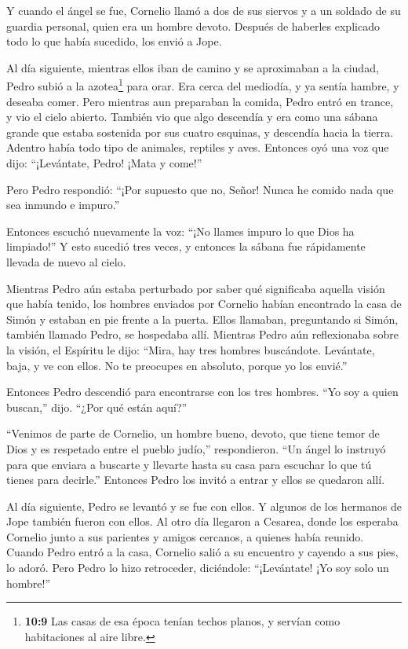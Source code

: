  Y cuando el ángel se fue, Cornelio llamó a dos de sus
siervos y a un soldado de su guardia personal, quien era un hombre
devoto.  Después de haberles explicado todo lo que había
sucedido, los envió a Jope.

 Al día siguiente, mientras ellos iban de camino y se
aproximaban a la ciudad, Pedro subió a la azotea\footnote{\textbf{10:9}
  Las casas de esa época tenían techos planos, y servían como
  habitaciones al aire libre.} para orar. Era cerca del mediodía,
 y ya sentía hambre, y deseaba comer. Pero mientras aun
preparaban la comida, Pedro entró en trance,  y vio el
cielo abierto. También vio que algo descendía y era como una sábana
grande que estaba sostenida por sus cuatro esquinas, y descendía hacia
la tierra.  Adentro había todo tipo de animales, reptiles y
aves.  Entonces oyó una voz que dijo: ``¡Levántate, Pedro!
¡Mata y come!''

 Pero Pedro respondió: ``¡Por supuesto que no, Señor! Nunca
he comido nada que sea inmundo e impuro.''

 Entonces escuchó nuevamente la voz: ``¡No llames impuro lo
que Dios ha limpiado!''  Y esto sucedió tres veces, y
entonces la sábana fue rápidamente llevada de nuevo al cielo.

 Mientras Pedro aún estaba perturbado por saber qué
significaba aquella visión que había tenido, los hombres enviados por
Cornelio habían encontrado la casa de Simón y estaban en pie frente a la
puerta.  Ellos llamaban, preguntando si Simón, también
llamado Pedro, se hospedaba allí.  Mientras Pedro aún
reflexionaba sobre la visión, el Espíritu le dijo: ``Mira, hay tres
hombres buscándote.  Levántate, baja, y ve con ellos. No te
preocupes en absoluto, porque yo los envié.''

 Entonces Pedro descendió para encontrarse con los tres
hombres. ``Yo soy a quien buscan,'' dijo. ``¿Por qué están aquí?''

 ``Venimos de parte de Cornelio, un hombre bueno, devoto,
que tiene temor de Dios y es respetado entre el pueblo judío,''
respondieron. ``Un ángel lo instruyó para que enviara a buscarte y
llevarte hasta su casa para escuchar lo que tú tienes para decirle.''
 Entonces Pedro los invitó a entrar y ellos se quedaron
allí.

Al día siguiente, Pedro se levantó y se fue con ellos. Y algunos de los
hermanos de Jope también fueron con ellos.  Al otro día
llegaron a Cesarea, donde los esperaba Cornelio junto a sus parientes y
amigos cercanos, a quienes había reunido.  Cuando Pedro
entró a la casa, Cornelio salió a su encuentro y cayendo a sus pies, lo
adoró.  Pero Pedro lo hizo retroceder, diciéndole:
``¡Levántate! ¡Yo soy solo un hombre!''

